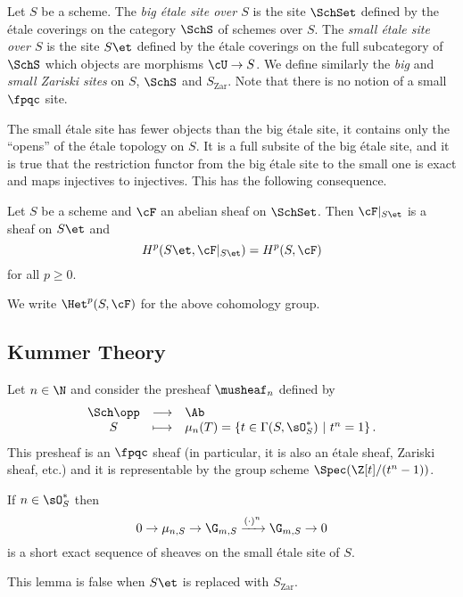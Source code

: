 \begin{defi}
Let $S$ be a scheme. The \emph{big \'etale site over $S$} is the site $\SchSet$ defined by the \'etale coverings on the category $\SchS$ of schemes over $S$. The \emph{small \'etale site over $S$} is the site $S\et$ defined by the \'etale coverings on the full subcategory of $\SchS$ which objects are morphisms $\cU \to S$. We define similarly the \emph{big} and \emph{small Zariski sites} on $S$, $\SchS$ and $S_\mathrm{Zar}$. Note that there is no notion of a small $\fpqc$ site.
\end{defi}

The small \'etale site has fewer objects than the big \'etale site, it contains only the ``opens'' of the \'etale topology on $S$. It is a full subsite of the big \'etale site, and it is true that the restriction functor from the big \'etale site to the small one is exact and maps injectives to injectives. This has the following consequence.

\begin{prop}
Let $S$ be a scheme and $\cF$ an abelian sheaf on $\SchSet$. Then $\cF|_{S\et}$ is a sheaf on $S\et$ and 
$$
H^p(S\et, \cF|_{S\et}) = H^p(S, \cF) 
$$
for all $p \geqslant 0$. 
\end{prop}

We write $\Het^p(S,\cF)$ for the above cohomology group.

\subsection{Kummer Theory}
Let $n \in \N$ and consider the presheaf $\musheaf_n$ defined by
$$
\begin{array}{ccl}
\Sch\opp & \longrightarrow  & \Ab \\
S & \longmapsto &  \mu_n(T) =  \left\{t \in \Gamma(S, \sO_S^*) \  | \ t^n = 1 \right\}.
\end{array}
$$
This presheaf is an $\fpqc$ sheaf (in particular, it is also an \'etale sheaf, Zariski sheaf, etc.) and it is representable by the group scheme $\Spec (\Z[t]/(t^n-1))$. 

\begin{lem} \label{lem:KummerSequence}
If $n\in \sO_S^*$ then 
$$
0\to \mu_{n, S} \to \G_{m, S} \xrightarrow{(\cdot)^n} \G_{m, S}\to 0
$$
is a short exact sequence of sheaves on the small \'etale site of  $S$. 
\end{lem}

\begin{remark}
This lemma is false when $S\et$ is replaced with $S_\mathrm{Zar}$.
\end{remark}

